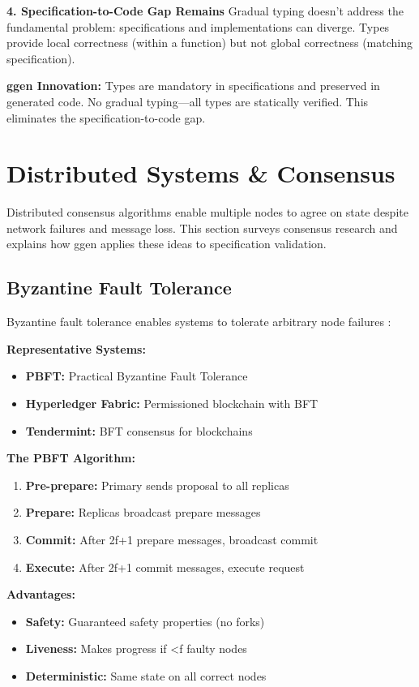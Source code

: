 \textbf{4. Specification-to-Code Gap Remains}
Gradual typing doesn't address the fundamental problem: specifications and implementations can diverge. Types provide local correctness (within a function) but not global correctness (matching specification).

\textbf{ggen Innovation:} Types are mandatory in specifications and preserved in generated code. No gradual typing---all types are statically verified. This eliminates the specification-to-code gap.

\section{Distributed Systems \& Consensus}

Distributed consensus algorithms enable multiple nodes to agree on state despite network failures and message loss. This section surveys consensus research and explains how ggen applies these ideas to specification validation.

\subsection{Byzantine Fault Tolerance}

Byzantine fault tolerance enables systems to tolerate arbitrary node failures \cite{lamport1982byzantine, castro1999practical}:

\textbf{Representative Systems:}
\begin{itemize}
    \item \textbf{PBFT:} Practical Byzantine Fault Tolerance
    \item \textbf{Hyperledger Fabric:} Permissioned blockchain with BFT
    \item \textbf{Tendermint:} BFT consensus for blockchains
\end{itemize}

\textbf{The PBFT Algorithm:}
\begin{enumerate}
    \item \textbf{Pre-prepare:} Primary sends proposal to all replicas
    \item \textbf{Prepare:} Replicas broadcast prepare messages
    \item \textbf{Commit:} After 2f+1 prepare messages, broadcast commit
    \item \textbf{Execute:} After 2f+1 commit messages, execute request
\end{enumerate}

\textbf{Advantages:}
\begin{itemize}
    \item \textbf{Safety:} Guaranteed safety properties (no forks)
    \item \textbf{Liveness:} Makes progress if <f faulty nodes
    \item \textbf{Deterministic:} Same state on all correct nodes
\end{itemize}

